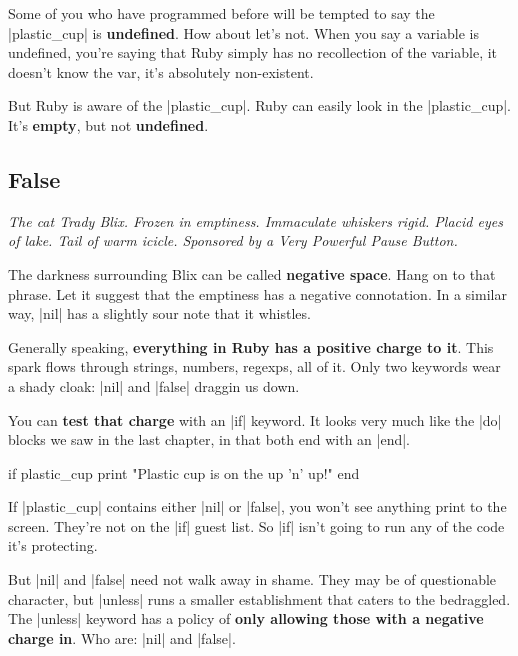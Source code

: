 \documentclass[12pt,twoside]{report}
\begin{document}
Some of you who have programmed before will be tempted to say the
\rubyinline|plastic_cup| is {\bf undefined}.  How
about let's not.  When you say a variable is undefined, you're saying
that Ruby simply has no recollection of the variable, it doesn't know
the var, it's absolutely non-existent.

But Ruby is aware of the \rubyinline|plastic_cup|.
Ruby can easily look in the
\rubyinline|plastic_cup|. It's {\bf empty}, but not
          {\bf undefined}.

\newpage



\subsection{False}




{\em The cat Trady Blix.  Frozen in emptiness.  Immaculate whiskers
  rigid.  Placid eyes of lake.  Tail of warm icicle.  Sponsored by a
  Very Powerful Pause Button.}

The darkness surrounding Blix can be called {\bf negative space}.
Hang on to that phrase. Let it suggest that the emptiness has a
negative connotation.  In a similar way,
\rubyinline|nil| has a slightly sour note that it
whistles.

Generally speaking, {\bf everything in Ruby has a positive charge to
  it}.  This spark flows through strings, numbers, regexps, all of it.
Only two keywords wear a shady cloak: \rubyinline|nil|
and \rubyinline|false| draggin us down.

You can {\bf test that charge} with an \rubyinline|if|
keyword.  It looks very much like the \rubyinline|do|
blocks we saw in the last chapter, in that both end with an
\rubyinline|end|.


\begin{rubycode}

 if plastic_cup 
   print "Plastic cup is on the up 'n' up!" 
 end

\end{rubycode}


If \rubyinline|plastic_cup| contains either
\rubyinline|nil| or
\rubyinline|false|, you won't see anything print to
the screen.  They're not on the \rubyinline|if| guest
list.  So \rubyinline|if| isn't going to run any of
the code it's protecting.

But \rubyinline|nil| and
\rubyinline|false| need not walk away in shame.  They
may be of questionable character, but
\rubyinline|unless| runs a smaller establishment that
caters to the bedraggled. The \rubyinline|unless|
keyword has a policy of {\bf only allowing those with a negative
  charge in}. Who are: \rubyinline|nil| and
\rubyinline|false|.
\end{document}
